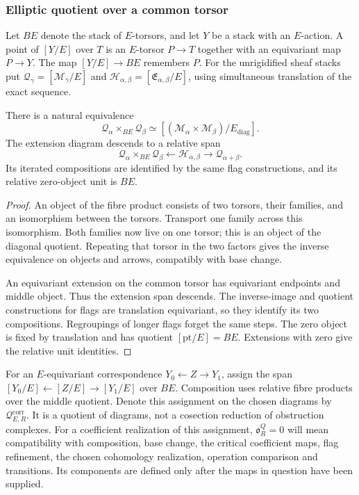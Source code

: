 \subsubsection*{Elliptic quotient over a common torsor}

Let $BE$ denote the stack of $E$-torsors, and let $Y$ be a stack
with an $E$-action. A point of $[Y/E]$ over
$T$ is an $E$-torsor $P\to T$ together with an equivariant map
$P\to Y$. The map $[Y/E]\to BE$ remembers $P$.
For the unrigidified sheaf stacks put
$\mathcal Q_\gamma=[\mathcal M_\gamma/E]$ and
$\mathcal H_{\alpha,\beta}=[\mathfrak E_{\alpha,\beta}/E]$,
using simultaneous translation of the exact sequence.

\begin{proposition}
\label{hall:prop:common-torsor}
There is a natural equivalence
\[
 \mathcal Q_\alpha\times_{BE}\mathcal Q_\beta
 \simeq[(\mathcal M_\alpha\times\mathcal M_\beta)/E_{\mathrm{diag}}].
\]
The extension diagram descends to a relative span
\[
 \mathcal Q_\alpha\times_{BE}\mathcal Q_\beta
 \longleftarrow\mathcal H_{\alpha,\beta}
 \longrightarrow\mathcal Q_{\alpha+\beta}.
\]
Its iterated compositions are identified by the same flag
constructions, and its relative zero-object unit is $BE$.
\end{proposition}

\begin{proof}
An object of the fibre product consists of two torsors, their
families, and an isomorphism between the torsors. Transport one
family across this isomorphism. Both families now live on one
torsor; this is an object of the diagonal quotient. Repeating that
torsor in the two factors gives the inverse equivalence on objects
and arrows, compatibly with base change.

An equivariant extension on the common torsor has equivariant
endpoints and middle object. Thus the extension span descends.
The inverse-image and quotient constructions for flags are
translation equivariant, so they identify its two compositions.
Regroupings of longer flags forget the same steps. The zero
object is fixed by translation and has quotient
$[\mathrm{pt}/E]=BE$. Extensions with zero give the relative
unit identities.
\end{proof}

\begin{definition}
\label{def:quotient-after-correspondence-pseudofunctor}
For an $E$-equivariant correspondence
$Y_0\leftarrow Z\to Y_1$, assign the span
$[Y_0/E]\leftarrow[Z/E]\to[Y_1/E]$ over $BE$.
Composition uses relative fibre products over the middle quotient.
Denote this assignment on the chosen diagrams by
$\mathcal Q^{\mathrm{corr}}_{E,R}$.
It is a quotient of diagrams, not a cosection reduction of
obstruction complexes.
For a coefficient realization of this assignment,
$\mathfrak o^Q_R=0$ will mean compatibility with composition,
base change, the critical coefficient maps, flag refinement,
the chosen cohomology realization, operation comparison and
transitions. Its components are defined only after the maps
in question have been supplied.
\end{definition}


